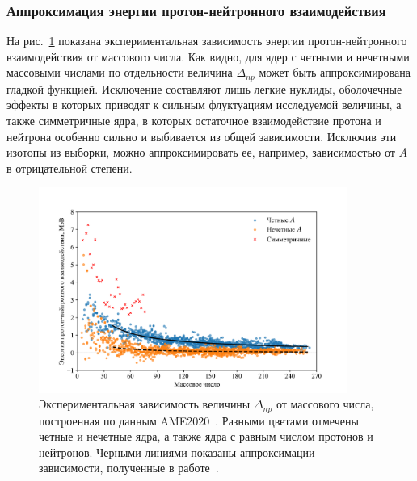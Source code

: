 \subsubsection{Аппроксимация энергии протон-нейтронного взаимодействия}
На рис.~\ref{fig:delta_np} показана экспериментальная зависимость энергии протон-нейтронного взаимодействия от массового числа. Как видно, для ядер с четными и нечетными массовыми числами по отдельности величина $\Delta_{np}$ может быть аппроксимирована гладкой функцией. Исключение составляют лишь легкие нуклиды, оболочечные эффекты в которых приводят к сильным флуктуациям исследуемой величины, а также симметричные ядра, в которых остаточное взаимодействие протона и нейтрона особенно сильно и выбивается из общей зависимости. Исключив эти изотопы из выборки, можно аппроксимировать ее, например, зависимостью от $A$ в отрицательной степени.

\begin{figure}
  \centering
  \includegraphics[width=0.9\textwidth]{../pics/delta_np.pdf}
  \caption{Экспериментальная зависимость величины $\Delta_{np}$ от массового числа, построенная по данным AME2020~\cite{huang2021}. Разными цветами отмечены четные и нечетные ядра, а также ядра с равным числом протонов и нейтронов. Черными линиями показаны аппроксимации зависимости, полученные в работе~\cite{vladimirova2022}.}
  \label{fig:delta_np}
\end{figure}

